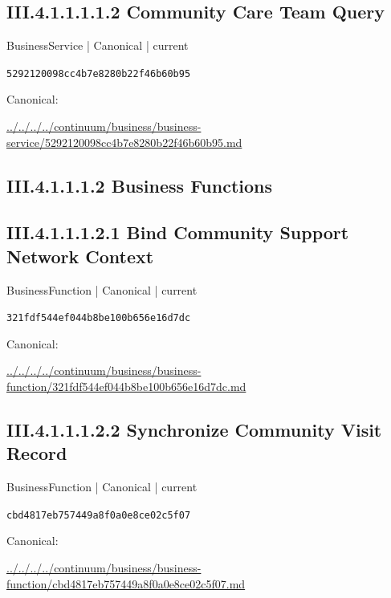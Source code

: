 \documentclass[10pt,a4paper]{article}
\begin{document}
\subsection*{III.4.1.1.1.1.2 Community Care Team Query}
\label{element-5292120098cc4b7e8280b22f46b60b95}
{\small BusinessService | Canonical | current}\par
\texttt{5292120098cc4b7e8280b22f46b60b95}\par
Canonical: \par
{\footnotesize\url{../../../../continuum/business/business-service/5292120098cc4b7e8280b22f46b60b95.md}}\par
\subsection*{III.4.1.1.1.2 Business Functions}
\subsection*{III.4.1.1.1.2.1 Bind Community Support Network Context}
\label{element-321fdf544ef044b8be100b656e16d7dc}
{\small BusinessFunction | Canonical | current}\par
\texttt{321fdf544ef044b8be100b656e16d7dc}\par
Canonical: \par
{\footnotesize\url{../../../../continuum/business/business-function/321fdf544ef044b8be100b656e16d7dc.md}}\par
\subsection*{III.4.1.1.1.2.2 Synchronize Community Visit Record}
\label{element-cbd4817eb757449a8f0a0e8ce02c5f07}
{\small BusinessFunction | Canonical | current}\par
\texttt{cbd4817eb757449a8f0a0e8ce02c5f07}\par
Canonical: \par
{\footnotesize\url{../../../../continuum/business/business-function/cbd4817eb757449a8f0a0e8ce02c5f07.md}}\par
\end{document}
